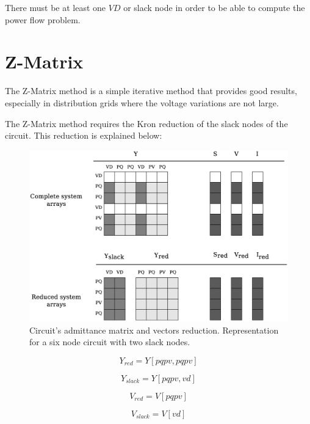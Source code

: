 \documentclass[nols,a4paper,twoside,notoc,fleqn]{tufte-book}
\begin{document}
There must be at least one $VD$ or slack node in order to be able to compute the power flow problem. 



\section{Z-Matrix}

The Z-Matrix method is a simple iterative method that provides good results, especially in distribution grids where the voltage variations are not large.

The Z-Matrix method requires the Kron reduction of the slack nodes of the circuit. This reduction is explained below:

\begin{figure}[h!]
  \includegraphics[width=\linewidth]{img/Matrix_reduction.eps}
  \caption{Circuit's admittance matrix and vectors reduction. Representation for a six node circuit with two slack nodes.}
  \label{fig:reduction}
\end{figure}

\begin{equation}
Y_{red} = Y[pqpv, pqpv]
\end{equation}

\begin{equation}
Y_{slack} = Y[pqpv, vd]
\end{equation}

\begin{equation}
V_{red} = V[pqpv]
\end{equation}

\begin{equation}
V_{slack} = V[vd]
\end{equation}
\end{document}
